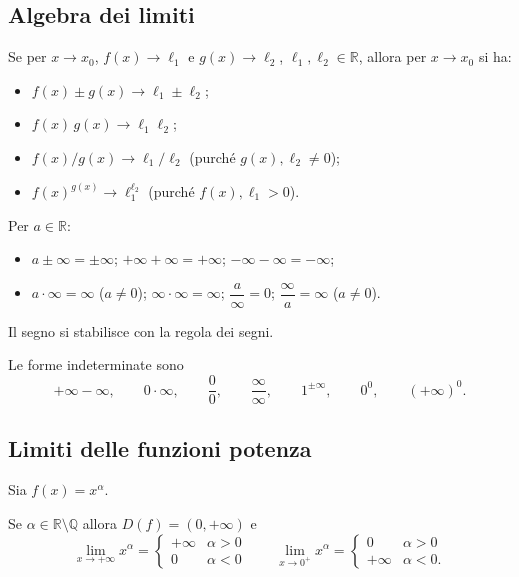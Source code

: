 \documentclass[11pt,a4paper]{article}
\begin{document}
\subsection{Algebra dei limiti}

\begin{teorema}
Se per $x \to x_0$, $f(x) \to \ell_1$ e $g(x) \to \ell_2$, $\ell_1, \ell_2 \in \mathbb{R}$, allora per $x \to x_0$ si ha:
\begin{itemize}
    \item $f(x) \pm g(x) \to \ell_1 \pm \ell_2$;
    \item $f(x)\,g(x) \to \ell_1 \ell_2$;
    \item $f(x)/g(x) \to \ell_1/\ell_2$ (purché $g(x), \ell_2 \neq 0$);
    \item $f(x)^{g(x)} \to \ell_1^{\ell_2}$ (purché $f(x), \ell_1 > 0$).
\end{itemize}
\end{teorema}

\begin{proprieta}
Per $a \in \mathbb{R}$:
\begin{itemize}
    \item $a \pm \infty = \pm\infty$; \quad $+\infty + \infty = +\infty$; \quad $-\infty - \infty = -\infty$;
    \item $a \cdot \infty = \infty$ ($a \neq 0$); \quad $\infty\cdot\infty = \infty$; \quad $\dfrac{a}{\infty} = 0$; \quad $\dfrac{\infty}{a} = \infty$ ($a \neq 0$).
\end{itemize}
Il segno si stabilisce con la regola dei segni.
\end{proprieta}

\begin{definizione}
Le forme indeterminate sono
\[
+\infty - \infty, \qquad 0 \cdot \infty, \qquad \frac{0}{0}, \qquad \frac{\infty}{\infty}, \qquad 1^{\pm\infty}, \qquad 0^0, \qquad (+\infty)^0 .
\]
\end{definizione}

\subsection{Limiti delle funzioni potenza}

Sia $f(x) = x^\alpha$.

Se $\alpha \in \mathbb{R}\setminus\mathbb{Q}$ allora $D(f) = (0, +\infty)$ e
\[
\lim_{x\to+\infty} x^\alpha = \begin{cases} +\infty & \alpha > 0 \\ 0 & \alpha < 0 \end{cases}
\qquad
\lim_{x\to 0^+} x^\alpha = \begin{cases} 0 & \alpha > 0 \\ +\infty & \alpha < 0. \end{cases}
\]
\end{document}
